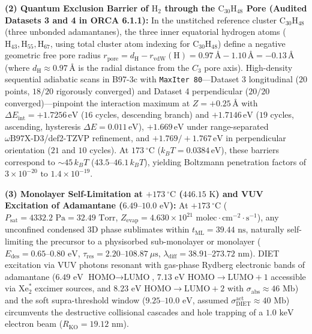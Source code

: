 \documentclass[10pt,twocolumn,a4paper]{article}
\begin{document}
\begin{@twocolumnfalse}
{    \noindent\textbf{(2) Quantum Exclusion Barrier of $\text{H}_2$ through the $\text{C}_{30}\text{H}_{48}$ Pore (Audited Datasets 3 and 4 in ORCA 6.1.1):} In the unstitched reference cluster $\text{C}_{30}\text{H}_{48}$ (three unbonded adamantanes), the three inner equatorial hydrogen atoms ($\text{H}_{43}, \text{H}_{55}, \text{H}_{67}$, using total cluster atom indexing for $\text{C}_{30}\text{H}_{48}$) define a negative geometric free pore radius $r_{\text{pore}} = d_{\text{H}} - r_{\text{vdW}}(\text{H}) = 0.97\,\text{\AA} - 1.10\,\text{\AA} = \mathbf{-0.13}\,\text{\AA}$ (where $d_{\text{H}} \approx 0.97\,\text{\AA}$ is the radial distance from the $C_3$ pore axis). High-density sequential adiabatic scans in B97-3c with \texttt{MaxIter 80}---Dataset 3 longitudinal ($20$ points, $18/20$ rigorously converged) and Dataset 4 perpendicular ($20/20$ converged)---pinpoint the interaction maximum at $Z = +0.25\,\text{\AA}$ with $\Delta E_{\text{int}} = \mathbf{+1.7256}\,\text{eV}$ ($16$ cycles, descending branch) and $\mathbf{+1.7146}\,\text{eV}$ ($19$ cycles, ascending, hysteresis $\Delta E = 0.011\,\text{eV}$), $\mathbf{+1.669}\,\text{eV}$ under range-separated $\omega\text{B97X-D3}$/def2-TZVP refinement, and $\mathbf{+1.769 / +1.767}\,\text{eV}$ in perpendicular orientation ($21$ and $10$ cycles). At $173\ ^\circ\text{C}$ ($k_B T = 0.0384\,\text{eV}$), these barriers correspond to ${\sim}45\,k_B T$ ($43.5\text{--}46.1\,k_B T$), yielding Boltzmann penetration factors of $3 \times 10^{-20}\text{ to }1.4 \times 10^{-19}$.

    \noindent\textbf{(3) Monolayer Self-Limitation at $+173\ ^\circ\text{C}$ ($446.15\text{ K}$) and VUV Excitation of Adamantane ($6.49\text{--}10.0\text{ eV}$):} At $+173\ ^\circ\text{C}$ ($P_{\text{sat}} = 4332.2\text{ Pa} = 32.49\text{ Torr}$, $Z_{\text{evap}} = 4.630 \times 10^{21}\text{ molec}\cdot\text{cm}^{-2}\cdot\text{s}^{-1}$), any unconfined condensed 3D phase sublimates within $t_{\text{ML}} = 39.44\text{ ns}$, naturally self-limiting the precursor to a physisorbed sub-monolayer or monolayer ($E_{\text{des}} = 0.65\text{--}0.80\text{ eV}$, $\tau_{\text{res}} = 2.20\text{--}108.87\ \mu\text{s}$, $\lambda_{\text{diff}} = 38.91\text{--}273.72\text{ nm}$). DIET excitation via VUV photons resonant with gas-phase Rydberg electronic bands of adamantane ($6.49\text{ eV}$ $\text{HOMO}\to\text{LUMO}$, $7.13\text{ eV}$ $\text{HOMO}\to\text{LUMO}+1$ accessible via $\text{Xe}_2^*$ excimer sources, and $8.23\text{ eV}$ $\text{HOMO}\to\text{LUMO}+2$ with $\sigma_{\text{abs}} \approx 46\text{ Mb}$) and the soft supra-threshold window ($9.25\text{--}10.0\text{ eV}$, assumed $\sigma_{\text{DIET}}^{\text{act}} \approx 40\text{ Mb}$) circumvents the destructive collisional cascades and hole trapping of a $1.0\text{ keV}$ electron beam ($R_{\text{KO}} = 19.12\text{ nm}$).

}
\end{@twocolumnfalse}
\end{document}
